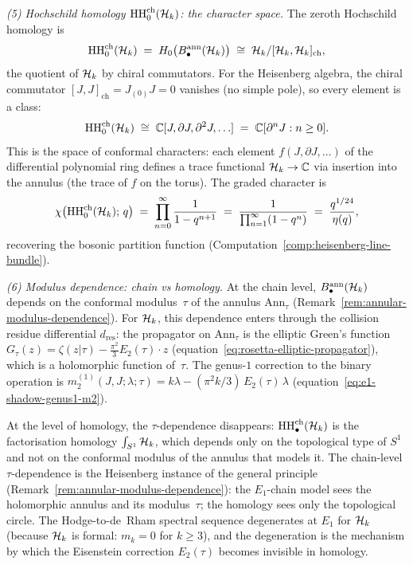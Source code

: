 \begin{computation}
\smallskip
\noindent
\emph{(5) Hochschild homology $\operatorname{HH}_0^{\mathrm{ch}}(\mathcal{H}_k)$:
the character space.}
The zeroth Hochschild homology is
\begin{equation}\label{eq:heisenberg-HH0}
\operatorname{HH}_0^{\mathrm{ch}}(\mathcal{H}_k)
\;=\;
H_0\bigl(B^{\mathrm{ann}}_\bullet(\mathcal{H}_k)\bigr)
\;\cong\;
\mathcal{H}_k / [\mathcal{H}_k, \mathcal{H}_k]_{\mathrm{ch}},
\end{equation}
the quotient of $\mathcal{H}_k$ by chiral commutators.
For the Heisenberg algebra, the chiral commutator
$[J,J]_{\mathrm{ch}} = J_{(0)}J = 0$ vanishes
(no simple pole), so every element is a class:
\[
\operatorname{HH}_0^{\mathrm{ch}}(\mathcal{H}_k)
\;\cong\;
\mathbb{C}[J, \partial J, \partial^2 J, \ldots]
\;=\;
\mathbb{C}[\partial^n J : n \ge 0].
\]
This is the space of conformal characters:
each element $f(J, \partial J, \ldots)$
of the differential polynomial ring defines a
trace functional
$\mathcal{H}_k \to \mathbb{C}$
via insertion into the annulus
(the trace of $f$ on the torus).
The graded character is
\[
\chi\bigl(\operatorname{HH}_0^{\mathrm{ch}}(\mathcal{H}_k);\, q\bigr)
\;=\;
\prod_{n=0}^{\infty} \frac{1}{1-q^{n+1}}
\;=\;
\frac{1}{\prod_{n=1}^{\infty}(1-q^n)}
\;=\;
\frac{q^{1/24}}{\eta(q)},
\]
recovering the bosonic partition function
(Computation~\ref{comp:heisenberg-line-bundle}).

\smallskip
\noindent
\emph{(6) Modulus dependence: chain vs homology.}
At the chain level, $B^{\mathrm{ann}}_\bullet(\mathcal{H}_k)$
depends on the conformal modulus~$\tau$ of the annulus
$\mathrm{Ann}_\tau$
(Remark~\ref{rem:annular-modulus-dependence}).
For $\mathcal{H}_k$, this dependence enters through
the collision residue differential $d_{\mathrm{res}}$:
the propagator on $\mathrm{Ann}_\tau$ is the elliptic
Green's function
$G_\tau(z) = \zeta(z|\tau) - \tfrac{\pi^2}{3}E_2(\tau)\cdot z$
(equation~\eqref{eq:rosetta-elliptic-propagator}),
which is a holomorphic function of~$\tau$. The
genus-$1$ correction to the binary operation is
$m_2^{(1)}(J,J;\lambda;\tau) = k\lambda
- (\pi^2 k/3)\, E_2(\tau)\, \lambda$
(equation~\eqref{eq:e1-shadow-genus1-m2}).

At the level of homology, the $\tau$-dependence disappears:
$\operatorname{HH}_\bullet^{\mathrm{ch}}(\mathcal{H}_k)$
is the factorisation homology $\int_{S^1}\mathcal{H}_k$,
which depends only on the topological type of $S^1$
and not on the conformal modulus of the annulus
that models it. The chain-level $\tau$-dependence
is the Heisenberg instance of the general
principle (Remark~\ref{rem:annular-modulus-dependence}):
the $E_1$-chain model sees the holomorphic annulus
and its modulus~$\tau$; the homology sees only the
topological circle. The Hodge-to-de~Rham spectral
sequence degenerates at $E_1$ for $\mathcal{H}_k$
(because $\mathcal{H}_k$ is formal: $m_k = 0$ for $k \ge 3$),
and the degeneration is the mechanism by which the
Eisenstein correction $E_2(\tau)$ becomes invisible
in homology.


\end{computation}
